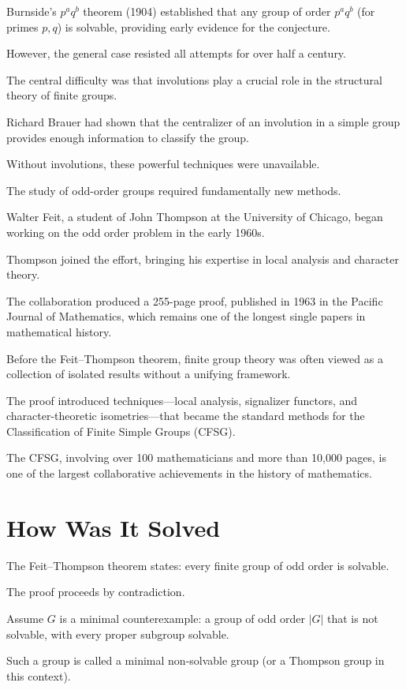 Burnside's $p^a q^b$ theorem (1904) established that any group of order $p^a q^b$ (for primes $p, q$) is solvable, providing early evidence for the conjecture.

However, the general case resisted all attempts for over half a century.

The central difficulty was that involutions play a crucial role in the structural theory of finite groups.

Richard Brauer had shown that the centralizer of an involution in a simple group provides enough information to classify the group.

Without involutions, these powerful techniques were unavailable.

The study of odd-order groups required fundamentally new methods.

Walter Feit, a student of John Thompson at the University of Chicago, began working on the odd order problem in the early 1960s.

Thompson joined the effort, bringing his expertise in local analysis and character theory.

The collaboration produced a 255-page proof, published in 1963 in the Pacific Journal of Mathematics, which remains one of the longest single papers in mathematical history.

Before the Feit--Thompson theorem, finite group theory was often viewed as a collection of isolated results without a unifying framework.

The proof introduced techniques---local analysis, signalizer functors, and character-theoretic isometries---that became the standard methods for the Classification of Finite Simple Groups (CFSG).

The CFSG, involving over 100 mathematicians and more than 10,000 pages, is one of the largest collaborative achievements in the history of mathematics.

\section{How Was It Solved}

The Feit--Thompson theorem states: every finite group of odd order is solvable.

The proof proceeds by contradiction.

Assume $G$ is a minimal counterexample: a group of odd order $|G|$ that is not solvable, with every proper subgroup solvable.

Such a group is called a minimal non-solvable group (or a Thompson group in this context).

